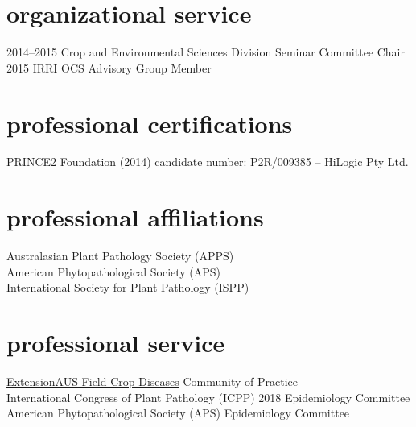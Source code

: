       \section*{organizational service}
        \begin{entrylist}
          \entry{}
          {2014--2015}
        	{Crop and Environmental Sciences Division Seminar Committee Chair}
        	{}
        	{}
	      \entry{}
        {2015}
        	{IRRI OCS Advisory Group Member}
        	{}
        	{}
        \end{entrylist}
        \section*{professional certifications}
        PRINCE2 Foundation (2014) candidate number: P2R/009385 – HiLogic Pty Ltd.

        \section*{professional affiliations}
        Australasian Plant Pathology Society (APPS)\\
        American Phytopathological Society (APS)\\
        International Society for Plant Pathology (ISPP)\\

        \section*{professional service}
        \href{http://extensionaus.com.au/field-crop-diseases/}{ExtensionAUS Field Crop Diseases} Community of Practice\\
        International Congress of Plant Pathology (ICPP) 2018 Epidemiology Committee\\
        American Phytopathological Society (APS) Epidemiology Committee\\
